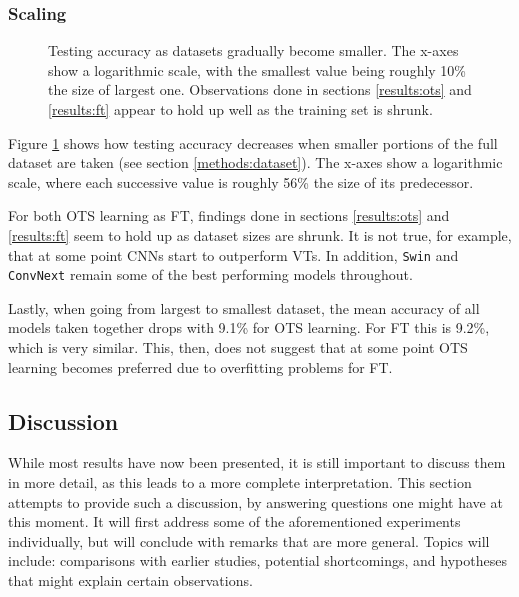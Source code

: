 \subsubsection{Scaling}

\begin{figure}[tb]
    \centering
    \def\svgwidth{\textwidth}
    
    \caption{Testing accuracy as datasets gradually become smaller. The x-axes show a logarithmic scale, with the smallest value being roughly 10\% the size of largest one. Observations done in sections \ref{results:ots} and \ref{results:ft} appear to hold up well as the training set is shrunk.}
    \label{results:img:scale}
\end{figure}

Figure \ref{results:img:scale} shows how testing accuracy decreases when smaller portions of the full dataset are taken (see section \ref{methods:dataset}). The x-axes show a logarithmic scale, where each successive value is roughly 56\% the size of its predecessor.

For both OTS learning as FT, findings done in sections \ref{results:ots} and \ref{results:ft} seem to hold up as dataset sizes are shrunk. It is not true, for example, that at some point CNNs start to outperform VTs. In addition, \texttt{Swin} and \texttt{ConvNext} remain some of the best performing models throughout. 

Lastly, when going from largest to smallest dataset, the mean accuracy of all models taken together drops with 9.1\% for OTS learning. For FT this is 9.2\%, which is very similar. This, then, does not suggest that at some point OTS learning becomes preferred due to overfitting problems for FT.


\subsection{Discussion} \label{exp:int} %
While most results have now been presented, it is still important to discuss them in more detail, as this leads to a more complete interpretation. This section attempts to provide such a discussion, by answering questions one might have at this moment. It will first address some of the aforementioned experiments individually, but will conclude with remarks that are more general. Topics will include: comparisons with earlier studies, potential shortcomings, and hypotheses that might explain certain observations.

